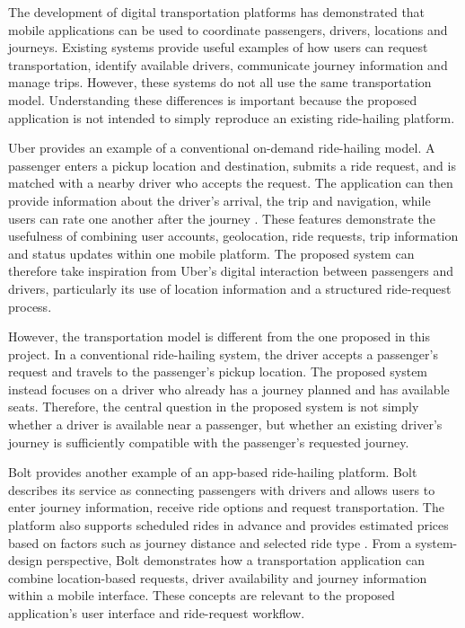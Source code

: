 The development of digital transportation platforms has demonstrated that mobile applications can be used to coordinate passengers, drivers, locations and journeys. Existing systems provide useful examples of how users can request transportation, identify available drivers, communicate journey information and manage trips. However, these systems do not all use the same transportation model. Understanding these differences is important because the proposed application is not intended to simply reproduce an existing ride-hailing platform.

Uber provides an example of a conventional on-demand ride-hailing model. A passenger enters a pickup location and destination, submits a ride request, and is matched with a nearby driver who accepts the request. The application can then provide information about the driver's arrival, the trip and navigation, while users can rate one another after the journey \citep{uber}. These features demonstrate the usefulness of combining user accounts, geolocation, ride requests, trip information and status updates within one mobile platform. The proposed system can therefore take inspiration from Uber's digital interaction between passengers and drivers, particularly its use of location information and a structured ride-request process.

However, the transportation model is different from the one proposed in this project. In a conventional ride-hailing system, the driver accepts a passenger's request and travels to the passenger's pickup location. The proposed system instead focuses on a driver who already has a journey planned and has available seats. Therefore, the central question in the proposed system is not simply whether a driver is available near a passenger, but whether an existing driver's journey is sufficiently compatible with the passenger's requested journey.

Bolt provides another example of an app-based ride-hailing platform. Bolt describes its service as connecting passengers with drivers and allows users to enter journey information, receive ride options and request transportation. The platform also supports scheduled rides in advance and provides estimated prices based on factors such as journey distance and selected ride type \citep{bolt}. From a system-design perspective, Bolt demonstrates how a transportation application can combine location-based requests, driver availability and journey information within a mobile interface. These concepts are relevant to the proposed application's user interface and ride-request workflow.

